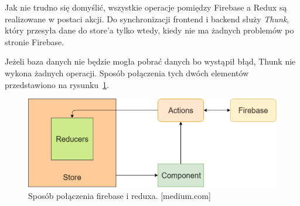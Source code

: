 Jak nie trudno się domyślić, wszystkie operacje pomiędzy Firebase a Redux są realizowane w postaci akcji.
Do synchronizacji frontend i backend służy \textit{Thunk},
który przesyła dane do store’a tylko wtedy,
kiedy nie ma żadnych problemów po stronie Firebase.

Jeżeli baza danych nie będzie mogła pobrać danych bo wystąpił błąd,
Thunk nie wykona żadnych operacji. Sposób połączenia tych dwóch elementów przedstawiono
na rysunku~\ref{rys:fireRedux}.

\begin{figure}
	\centering\includegraphics[width=.6\textwidth]{img/fireRedux.png}
	\caption{Sposób połączenia firebase i reduxa. [medium.com]}\label{rys:fireRedux}%
\end{figure}
